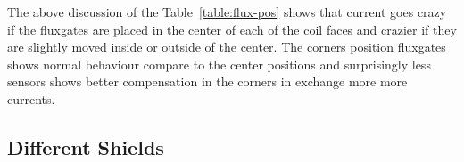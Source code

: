 \FloatBarrier





The above discussion of the Table~\ref{table:flux-pos} shows that current goes crazy if the fluxgates are placed in the center of each of the coil faces and crazier if they are slightly moved inside or outside of the center. The corners position fluxgates shows normal behaviour compare to the center positions and surprisingly less sensors shows better compensation in the corners in exchange more more currents.

\FloatBarrier
\subsection{Different Shields}


